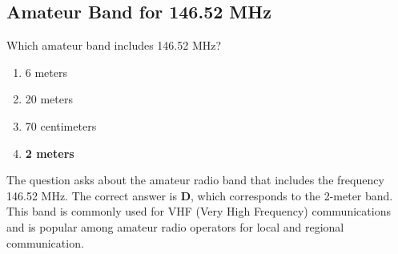 \subsection{Amateur Band for 146.52 MHz}
\label{T1B04}

\begin{tcolorbox}[colback=gray!10!white,colframe=black!75!black,title=T1B04]
Which amateur band includes 146.52 MHz?
\begin{enumerate}[label=\Alph*),noitemsep]
    \item 6 meters
    \item 20 meters
    \item 70 centimeters
    \item \textbf{2 meters}
\end{enumerate}
\end{tcolorbox}

The question asks about the amateur radio band that includes the frequency 146.52 MHz. The correct answer is \textbf{D}, which corresponds to the 2-meter band. This band is commonly used for VHF (Very High Frequency) communications and is popular among amateur radio operators for local and regional communication.
